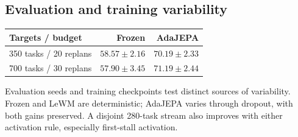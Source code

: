 \begin{table}[!t]
\begin{minipage}[t]{\columnwidth}
\subsection{Evaluation and training variability}
\label{sec:eval-seeds}\label{sec:replication}
\par\smallskip
{\centering\par}
\end{minipage}\hfill
\begin{minipage}[t]{\columnwidth}
\vspace{0pt}
\par\smallskip
{\centering
{}
\label{tab:training}
\small
\begin{tabular}{lrr}
\toprule
Targets / budget & Frozen & AdaJEPA\\
\midrule
350 tasks / 20 replans &$58.57\pm2.16$&$70.19\pm2.33$\\
700 tasks / 30 replans &$57.90\pm3.45$&$71.19\pm2.44$\\
\bottomrule
\end{tabular}
\par}
\par\smallskip
Evaluation seeds and training checkpoints test distinct sources of variability. Frozen and LeWM are deterministic; AdaJEPA varies through dropout, with both gains preserved. A disjoint 280-task stream also improves with either activation rule, especially first-stall activation.\par

\end{minipage}\par

\end{table}
\clearpage
